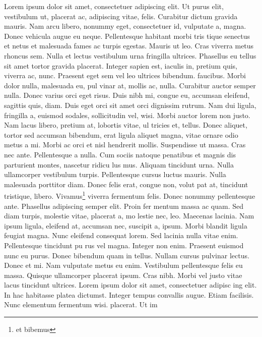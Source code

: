\documentclass[10pt]{article}
\begin{document}
\beginnumbering
\pstart
{}
Lorem ipsum dolor sit amet, consectetuer adipiscing elit. Ut purus elit,
vestibulum ut, placerat ac, adipiscing vitae, felis. Curabitur dictum gravida
mauris. Nam arcu libero, nonummy eget, consectetuer id, vulputate a,
magna. Donec vehicula augue eu neque. Pellentesque habitant morbi tris
tique senectus et netus et malesuada fames ac turpis egestas. Mauris ut leo.
Cras viverra metus rhoncus sem. Nulla et lectus vestibulum urna fringilla
ultrices. Phasellus eu tellus sit amet tortor gravida placerat. Integer sapien
est, iaculis in, pretium quis, viverra ac, nunc. Praesent eget sem vel leo
ultrices bibendum.  faucibus. Morbi dolor nulla, malesuada eu, pul
vinar at, mollis ac, nulla. Curabitur auctor semper nulla. Donec varius orci
eget risus. Duis nibh mi, congue eu, accumsan eleifend, sagittis quis, diam.
Duis eget orci sit amet orci dignissim rutrum.
Nam dui ligula, fringilla a, euismod sodales, sollicitudin vel, wisi. Morbi
auctor lorem non justo. Nam lacus libero, pretium at, lobortis vitae, ul
tricies et, tellus. Donec aliquet, tortor sed accumsan bibendum, erat ligula
aliquet magna, vitae ornare odio metus a mi. Morbi ac orci et nisl hendrerit
mollis. Suspendisse ut massa. Cras nec ante. Pellentesque a nulla. Cum
sociis natoque penatibus et magnis dis parturient montes, nascetur ridicu
lus mus. Aliquam tincidunt urna. Nulla ullamcorper vestibulum turpis.
Pellentesque cursus luctus mauris.
Nulla malesuada porttitor diam. Donec felis erat, congue non, volut
pat at, tincidunt tristique, libero. Vivamus\footnote{et bibemus} viverra fermentum felis. Donec
nonummy pellentesque ante. Phasellus adipiscing semper elit. Proin fer
mentum massa ac quam. Sed diam turpis, molestie vitae, placerat a, mo
lestie nec, leo. Maecenas lacinia. Nam ipsum ligula, eleifend at, accumsan
nec, suscipit a, ipsum. Morbi blandit ligula feugiat magna. Nunc eleifend
consequat lorem. Sed lacinia nulla vitae enim. Pellentesque tincidunt pu
rus vel magna. Integer non enim. Praesent euismod nunc eu purus. Donec
bibendum quam in tellus. Nullam cursus pulvinar lectus. Donec et mi.
Nam vulputate metus eu enim. Vestibulum pellentesque felis eu massa.
Quisque ullamcorper placerat ipsum. Cras nibh. Morbi vel justo vitae
lacus tincidunt ultrices. Lorem ipsum dolor sit amet, consectetuer adipisc
ing elit. In hac habitasse platea dictumst. Integer tempus convallis augue.
Etiam facilisis. Nunc elementum fermentum wisi.  placerat. Ut im
\end{document}
